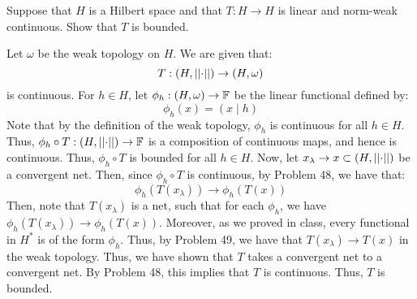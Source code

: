 \documentclass[12pt]{article}
\begin{document}
\begin{problem}{6}
    Suppose that $H$ is a Hilbert space and that $T : H \to H$ is linear and norm-weak continuous. Show that $T$ is bounded.
\end{problem}
\begin{solution}
    Let $\omega$ be the weak topology on $H$. We are given that: 
    \[ T: (H, \left\vert\left\vert\cdot\right\vert\right\vert) \to (H, \omega)\]
    is continuous. For $h \in H$, let $\phi_h: (H, \omega) \to \mathbb F$ be the linear functional defined by: 
    \[ \phi_h(x) = (x \mid h) \]
    Note that by the definition of the weak topology, $\phi_h$ is continuous for all $h \in H$. Thus, $\phi_h \circ T: (H, \left\vert\left\vert\cdot\right\vert\right\vert) \to \mathbb F$ is a composition of continuous maps, and hence is continuous. Thus, $\phi_h \circ T$ is bounded for all $h \in H$. \bbni 
    Now, let $x_\lambda \to x \subset (H, \left\vert\left\vert\cdot\right\vert\right\vert)$ be a convergent net. Then, since $\phi_h \circ T$ is continuous, by Problem 48, we have that:
    \[ \phi_h(T(x_\lambda))  \to \phi_h(T(x))\]
    Then, note that $T(x_\lambda)$ is a net, such that for each $\phi_h$, we have $\phi_h(T(x_\lambda)) \to \phi_h(T(x))$. Moreover, as we proved in class, every functional in $H^*$ is of the form $\phi_h$. Thus, by Problem 49, we have that $T(x_\lambda) \to T(x)$ in the weak topology. \bbni
    Thus, we have shown that $T$ takes a convergent net to a convergent net. By Problem 48, this implies that $T$ is continuous. Thus, $T$ is bounded.    
\end{solution}
\end{document}
